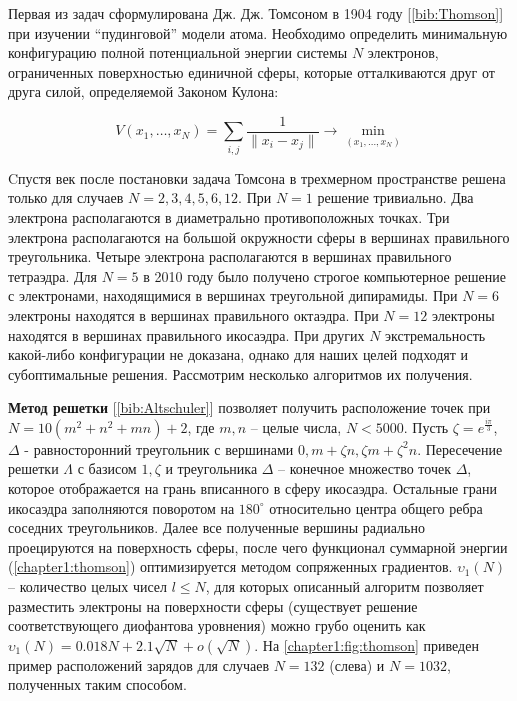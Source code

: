 Первая из задач сформулирована Дж. Дж. Томсоном в 1904 году [\ref{bib:Thomson}] при изучении \enquote{пудинговой} модели атома. 
Необходимо определить минимальную конфигурацию полной потенциальной энергии системы $N$ электронов, ограниченных поверхностью единичной сферы, которые отталкиваются друг от друга силой, определяемой Законом Кулона:

\begin{equation}\label{chapter1:thomson}
V(x_1, \dots, x_N) = \sum\limits_{i,j} \frac{1}{ \|x_i-x_j\| } \to \min\limits_{(x_1, \dots, x_N)}
\end{equation}

Cпустя век после постановки задача Томсона в трехмерном пространстве решена только для случаев 
$N = 2, 3, 4, 5, 6, 12$. 
При $N = 1$ решение тривиально. 
Два электрона располагаются в диаметрально противоположных точках.
Три электрона располагаются на большой окружности сферы в вершинах правильного треугольника.
Четыре электрона располагаются в вершинах правильного тетраэдра.
Для $N = 5$ в 2010 году было получено строгое компьютерное решение с электронами, находящимися в вершинах треугольной дипирамиды.
При $N = 6$ электроны находятся в вершинах правильного октаэдра.
При $N = 12$ электроны находятся в вершинах правильного икосаэдра.
При других $N$ экстремальность какой-либо конфигурации не доказана, 
однако для наших целей подходят и субоптимальные решения. Рассмотрим несколько алгоритмов их получения.

\textbf{Метод решетки} [\ref{bib:Altschuler}] позволяет получить расположение точек при $N = 10(m^2 + n^2 + mn) + 2$, 
где $m,n$ -- целые числа, $N < 5000$. 
Пусть $\zeta = e^{\frac{i\pi}{3}}$, $\Delta$ - 
равносторонний треугольник с вершинами $0, m + \zeta n, \zeta m + \zeta^2 n$. Пересечение решетки $\Lambda$ с базисом $1, \zeta$ 
и треугольника $\Delta$ -- конечное множество точек $\Delta$, которое отображается на грань вписанного в сферу икосаэдра. 
Остальные грани икосаэдра заполняются поворотом на $180^{\circ}$ относительно центра общего ребра соседних треугольников. 
Далее все полученные вершины радиально проецируются на поверхность сферы, после чего функционал суммарной энергии 
(\ref{chapter1:thomson}) оптимизируется методом сопряженных градиентов. 
$\upsilon_1(N)$ -- количество целых чисел $l \le N$, для которых описанный алгоритм позволяет разместить электроны 
на поверхности сферы (существует решение соответствующего диофантова уровнения) можно грубо оценить как
$\upsilon_1(N) = 0.018N + 2.1\sqrt{N} + o(\sqrt{N})$.
На \figurename{ \ref{chapter1:fig:thomson}} приведен пример расположений зарядов для случаев $N=132$ (слева) и $N=1032$, полученных таким способом.

